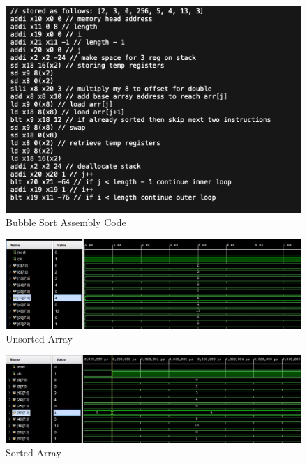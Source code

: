 \documentclass[12pt]{article}
\begin{document}
        \begin{figure}
            \centering
            \includegraphics[width=\textwidth]{bubbleSort.png}
            \caption{Bubble Sort Assembly Code}
            \label{fig:1}
        \end{figure}

        \begin{figure}
            \centering
            \includegraphics[width=\textwidth]{unsorted.JPG}
            \caption{Unsorted Array}
            \label{fig:2}
        \end{figure}

        \begin{figure}
            \centering
            \includegraphics[width=\textwidth]{sorted.JPG}
            \caption{Sorted Array}
            \label{fig:3}
        \end{figure}
\end{document}
